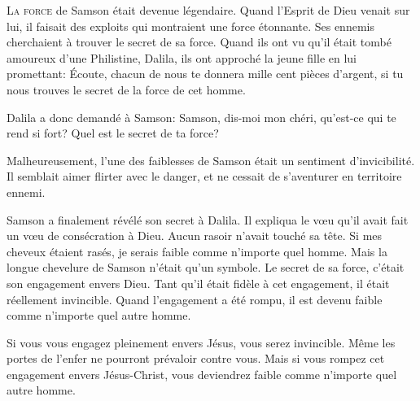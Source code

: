 \dvrule







\lettrine{L}{a force} de Samson était devenue légendaire.
 Quand l'Esprit de Dieu venait sur lui, il faisait des exploits
 qui montraient une force étonnante.
 Ses ennemis cherchaient à trouver le secret de sa force.
 Quand ils ont vu qu'il était tombé amoureux d'une Philistine, Dalila,
 ils ont approché la jeune fille en lui promettant:
 \Og Écoute, chacun de nous te donnera mille cent pièces d'argent,
 si tu nous trouves le secret de la force de cet homme. \Fg{}

Dalila a donc demandé à Samson:
 \Og Samson, dis-moi mon chéri, qu'est-ce qui te rend si fort?
 Quel est le secret de ta force? \Fg{}

Malheureusement, l'une des faiblesses de Samson était
 un sentiment d'invicibilité.
 Il semblait aimer flirter avec le danger,
 et ne cessait de s'aventurer en territoire ennemi.

Samson a finalement révélé son secret à Dalila.
 Il expliqua le v\oe{}u qu'il avait fait
 \ocadr un v\oe{}u de consécration à Dieu.
 Aucun rasoir n'avait touché sa tête.
 \Og Si mes cheveux étaient rasés,
 je serais faible comme n'importe quel homme. \Fg{}
 Mais la longue chevelure de Samson n'était qu'un symbole.
 Le secret de sa force, c'était son engagement envers Dieu.
 Tant qu'il était fidèle à cet engagement, il était réellement invincible.
 Quand l'engagement a été rompu, il est devenu faible
 comme n'importe quel autre homme.


Si vous vous engagez pleinement envers Jésus, vous serez invincible.
 Même les portes de l'enfer ne pourront prévaloir contre vous.
 Mais si vous rompez cet engagement envers Jésus-Christ,
 vous deviendrez faible comme n'importe quel autre homme. 

